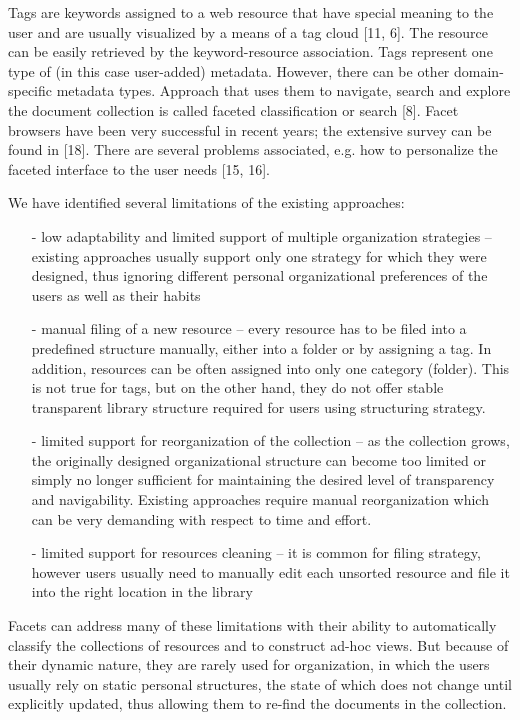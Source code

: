 \documentclass[12pt]{article}
\begin{document}
  Tags are keywords assigned to a web resource that have special meaning to the user and are usually visualized by a means of a tag cloud [11, 6]. The resource can be easily retrieved by the keyword-resource association. Tags represent one type of (in this case user-added) metadata. However, there can be other domain-specific metadata types.  Approach that uses them to navigate, search and explore the document collection is called faceted classification or search [8]. Facet browsers have been very successful in recent years; the extensive survey can be found in [18]. There are several problems associated, e.g. how to personalize the faceted interface to the user needs [15, 16]. 
  
  We have identified several limitations of the existing approaches: 
  
    \begin{itemize}
        \item[-]  low adaptability and limited support of multiple organization strategies – existing approaches usually support only one strategy for which they were designed, thus ignoring different personal organizational preferences of the users as well as their habits
        \item[-] manual filing of a new resource – every resource has to be filed into a predefined structure manually, either into a folder or by assigning a tag. In addition, resources can be often assigned into only one category (folder). This is not true for tags, but on the other hand, they do not offer stable transparent library structure required for users using structuring strategy.
        \item[-]limited support for reorganization of the collection – as the collection grows, the originally designed organizational structure can become too limited or simply no longer sufficient for maintaining the desired level of transparency and navigability. Existing approaches require manual reorganization which can be very demanding with respect to time and effort. 
        \item[-] limited support for resources cleaning – it is common for filing strategy, however users usually need to manually edit each unsorted resource and file it into the right location in the library
        \end{itemize}

Facets can address many of these limitations with their ability to automatically classify the collections of resources and to construct ad-hoc views. But because of their dynamic nature, they are rarely used for organization, in which the users usually rely on static personal structures, the state of which does not change until explicitly updated, thus allowing them to re-find the documents in the collection.
\end{document}

